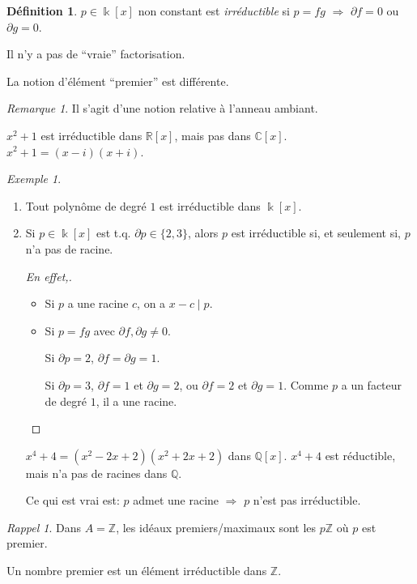 \documentclass{report}
\theoremstyle{definition}
\newtheorem*{dfn}{D\'efinition}
\theoremstyle{remark}
\newtheorem*{exem}{Exemple}
\newtheorem*{rmq}{Remarque}
\newtheorem*{rapp}{Rappel}
\def\ZZ{\mathbb{Z}}
\def\QQ{\mathbb{Q}}
\def\RR{\mathbb{R}}
\def\CC{\mathbb{C}}
\begin{document}
	\begin{dfn}
		$p\in\Bbbk[x]$ non constant est \emph{irr\'eductible} si $p=fg$ $\Longrightarrow$ $\partial f=0$ ou $\partial g=0$.

		Il n'y a pas de ``vraie'' factorisation.

		La notion d'\'el\'ement ``premier'' est diff\'erente.
	\end{dfn}

	\begin{rmq}
		Il s'agit d'une notion relative \`a l'anneau ambiant.

		$x^2+1$ est irr\'eductible dans $\RR[x]$, mais pas dans $\CC[x]$. $x^2+1=(x-i)(x+i)$.
	\end{rmq}

	\begin{exem}
		\begin{enumerate}
			\item Tout polyn\^ome de degr\'e $1$ est irr\'eductible dans $\Bbbk[x]$.
			\item Si $p\in\Bbbk[x]$ est t.q. $\partial p\in\{2,3\}$, alors $p$ est irr\'eductible si, et seulement si, $p$ n'a pas de racine.
			\begin{proof}[En effet,]
				\begin{itemize}
					\item[$\Rightarrow$:] Si $p$ a une racine $c$, on a $x-c\mid p$.
					\item[$\Leftarrow$:] Si $p=fg$ avec $\partial f,\partial g\neq0$.

					Si $\partial p=2$, $\partial f=\partial g=1$.

					Si $\partial p=3$, $\partial f=1$ et $\partial g=2$, ou $\partial f=2$ et $\partial g=1$. Comme $p$ a un facteur de degr\'e $1$, il a une racine.
				\end{itemize}
			\end{proof}

			$x^4+4=(x^2-2x+2)(x^2+2x+2)$ dans $\QQ[x]$. $x^4+4$ est r\'eductible, mais n'a pas de racines dans $\QQ$.

			Ce qui est vrai est: $p$ admet une racine $\Longrightarrow$ $p$ n'est pas irr\'eductible.
		\end{enumerate}
	\end{exem}

	\begin{rapp}
		Dans $A=\ZZ$, les id\'eaux premiers/maximaux sont les $p\ZZ$ o\`u $p$ est premier.

		Un nombre premier est un \'el\'ement irr\'eductible dans $\ZZ$.
	\end{rapp}
\end{document}
